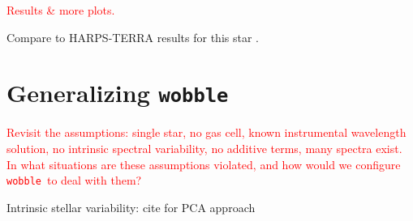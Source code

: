 \documentclass[twocolumn]{aastex62}
\newcommand{\todo}[1]{\textcolor{red}{#1}}  %
\newcommand{\code}[1]{\texttt{#1}}
\newcommand{\wobble}{\code{wobble}}
\begin{document}
\todo{Results \& more plots.}

Compare to HARPS-TERRA results for this star \citep{AngladaEscude2012}.

\section{Generalizing \wobble}
\label{s:future}

\todo{Revisit the assumptions: single star, no gas cell, known instrumental wavelength solution, no intrinsic spectral variability, no additive terms, many spectra exist. 
In what situations are these assumptions violated, and how would we configure \wobble\ to deal with them?}

Intrinsic stellar variability: cite \citet{Davis2017} for PCA approach


\end{document}
